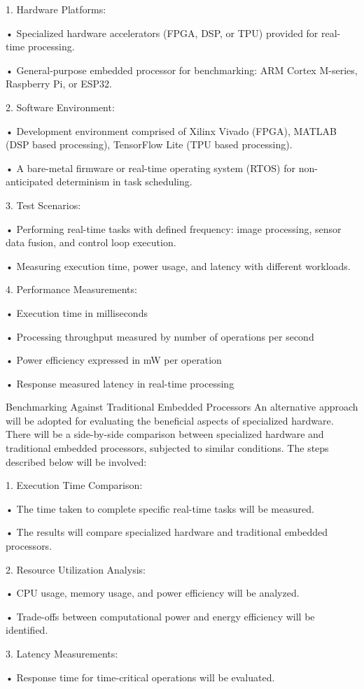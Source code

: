\documentclass{article}
\begin{document}
1. Hardware Platforms:

• Specialized hardware accelerators (FPGA, DSP, or TPU) provided for real-time processing.

• General-purpose embedded processor for benchmarking: ARM Cortex M-series, Raspberry Pi,
or ESP32.

2. Software Environment:

• Development environment comprised of Xilinx Vivado (FPGA), MATLAB (DSP based
processing), TensorFlow Lite (TPU based processing).

• A bare-metal firmware or real-time operating system (RTOS) for non-anticipated determinism
in task scheduling.

3. Test Scenarios:

• Performing real-time tasks with defined frequency: image processing, sensor data fusion, and
control loop execution.

• Measuring execution time, power usage, and latency with different workloads.

4. Performance Measurements:

• Execution time in milliseconds

• Processing throughput measured by number of operations per second

• Power efficiency expressed in mW per operation

• Response measured latency in real-time processing

Benchmarking Against Traditional Embedded Processors
An alternative approach will be adopted for evaluating the beneficial aspects of specialized
hardware.
There will be a side-by-side comparison between specialized hardware and traditional
embedded processors, subjected to similar conditions. The steps described below will be
involved:

1. Execution Time Comparison:

• The time taken to complete specific real-time tasks will be measured.

• The results will compare specialized hardware and traditional embedded processors.

2. Resource Utilization Analysis:

• CPU usage, memory usage, and power efficiency will be analyzed.

• Trade-offs between computational power and energy efficiency will be identified.

3. Latency Measurements:

• Response time for time-critical operations will be evaluated.
\end{document}

